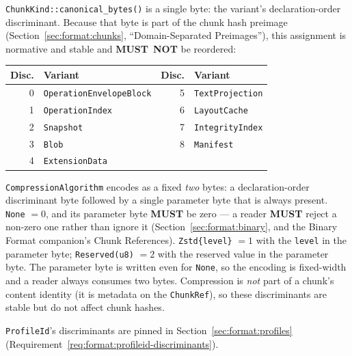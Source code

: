 \documentclass[11pt,letterpaper]{report}
\newcommand{\sectionsc}[1]{{\addfontfeatures{Letters=SmallCaps}#1}}
\newcounter{requirement}[chapter]
\newcommand{\MUST}{\textbf{MUST}}
\newcommand{\MUSTNOT}{\textbf{MUST}\nobreak\ \textbf{NOT}}
\begin{document}
\begin{requirement}
  \label{req:format:chunkkind-discriminants}
  \texttt{ChunkKind::canonical\_bytes()} is a single byte: the
  variant's declaration-order discriminant. Because that byte is part
  of the chunk hash preimage (Section~\ref{sec:format:chunks},
  ``Domain-Separated Preimages''), this assignment is normative and
  stable and \MUSTNOT{} be reordered:

  \begin{center}
  \begin{tabular}{r l @{\qquad} r l}
    \toprule
    \textbf{Disc.} & \textbf{Variant} &
    \textbf{Disc.} & \textbf{Variant} \\
    \midrule
    0 & \texttt{OperationEnvelopeBlock} & 5 & \texttt{TextProjection} \\
    1 & \texttt{OperationIndex}         & 6 & \texttt{LayoutCache} \\
    2 & \texttt{Snapshot}               & 7 & \texttt{IntegrityIndex} \\
    3 & \texttt{Blob}                   & 8 & \texttt{Manifest} \\
    4 & \texttt{ExtensionData}          &   & \\
    \bottomrule
  \end{tabular}
  \end{center}

  \texttt{CompressionAlgorithm} encodes as a fixed \emph{two} bytes: a
  declaration-order discriminant byte followed by a single parameter
  byte that is always present. \texttt{None} $= 0$, and its parameter
  byte \MUST{} be zero --- a reader \MUST{} reject a non-zero one rather
  than ignore it (Section~\ref{sec:format:binary}, and the Binary Format
  companion's \sectionsc{Chunk References}). \texttt{Zstd\{level\}}
  $= 1$ with the \texttt{level} in the parameter byte;
  \texttt{Reserved(u8)} $= 2$ with the reserved value in the parameter
  byte. The parameter byte is written even for \texttt{None}, so the
  encoding is fixed-width and a reader always consumes two bytes.
  Compression is \emph{not} part of a
  chunk's content identity (it is metadata on the \texttt{ChunkRef}),
  so these discriminants are stable but do not affect chunk hashes.

  \texttt{ProfileId}'s discriminants are pinned in
  Section~\ref{sec:format:profiles}
  (Requirement~\ref{req:format:profileid-discriminants}).
\end{requirement}
\end{document}
